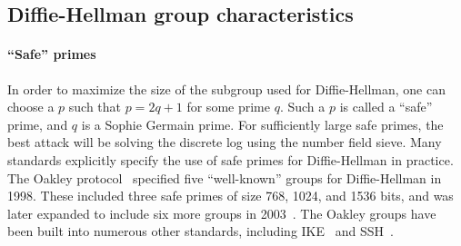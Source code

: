 \subsection{Diffie-Hellman group characteristics}

\paragraph{``Safe'' primes}
In order to maximize the size of the subgroup used for Diffie-Hellman, one can
choose a $p$ such that $p = 2q + 1$ for some prime $q$. Such a $p$ is called a
``safe'' prime, and $q$ is a Sophie Germain prime.  For sufficiently large safe
primes, the best attack will be solving the discrete log using the number field
sieve.
Many standards explicitly specify the use of safe primes for Diffie-Hellman in
practice.  The Oakley protocol~\cite{rfc2412} specified five ``well-known''
groups for Diffie-Hellman in 1998. These included three safe primes of size
768, 1024, and 1536 bits, and was later expanded to include six more groups in
2003~\cite{rfc3526}. The Oakley groups have been built into numerous other
standards, including IKE~\cite{rfc2409} and SSH~\cite{rfc4253}.

%
%
%
%
%

